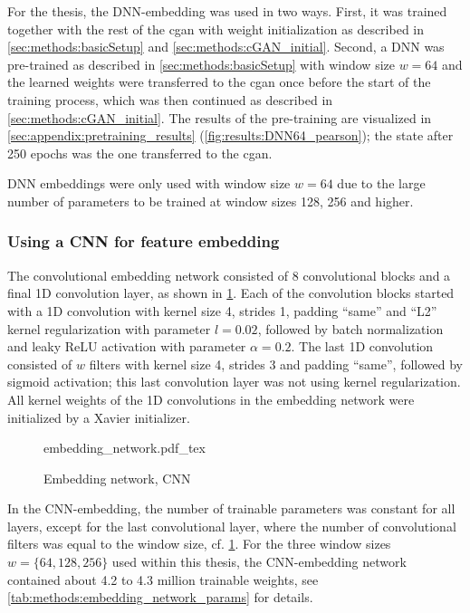 For the thesis, the DNN-embedding was used in two ways.
First, it was trained together with the rest of the \acrshort{cgan} with weight initialization as described in 
\cref{sec:methods:basicSetup} and \ref{sec:methods:cGAN_initial}.
Second, a DNN was pre-trained as described in \cref{sec:methods:basicSetup} with window size $w=64$
and the learned weights were transferred to the \acrshort{cgan} once before the start of the training process,
which was then continued as described in \cref{sec:methods:cGAN_initial}.
The results of the pre-training are visualized in \cref{sec:appendix:pretraining_results} (\cref{fig:results:DNN64_pearson});
the state after 250 epochs was the one transferred to the \acrshort{cgan}.

DNN embeddings were only used with window size $w=64$ due to the large number of parameters
to be trained at window sizes 128, 256 and higher.

\subsubsection{Using a CNN for feature embedding} \label{sec:methods:cnn-embedding}
The convolutional embedding network consisted of 8 convolutional blocks and a final 1D convolution layer, 
as shown in \cref{fig:methods:GAN_arch:embedding_network}.
Each of the convolution blocks started with a 1D convolution with kernel size 4, strides 1, padding ``same'' 
and ``L2'' kernel regularization with parameter $l=0.02$, followed by batch normalization and leaky ReLU activation
with parameter $\alpha=0.2$. 
The last 1D convolution consisted of $w$ filters with kernel size 4, strides 3 and padding ``same'',
followed by sigmoid activation; this last convolution layer was not using kernel regularization.
All kernel weights of the 1D convolutions in the embedding network were initialized by a Xavier initializer.
\begin{figure}[p]
    \scriptsize
    \centering
    {embedding_network.pdf_tex}
    \caption{Embedding network, CNN} \label{fig:methods:GAN_arch:embedding_network}
\end{figure}

In the CNN-embedding, the number of trainable parameters was constant for all layers, except for the last convolutional layer, where the number
of convolutional filters was equal to the window size, cf. \cref{fig:methods:GAN_arch:embedding_network}. 
For the three window sizes $w=\{64,128,256\}$ used within this thesis, the CNN-embedding network 
contained about 4.2 to 4.3 million trainable weights, see \cref{tab:methods:embedding_network_params} for details.

